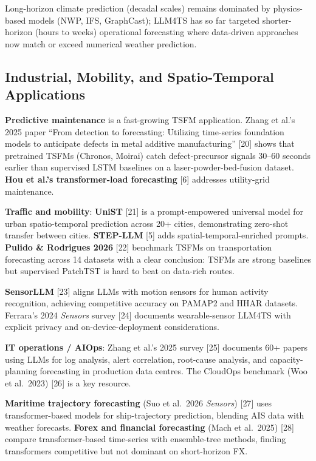 \documentclass{article}
\begin{document}
Long-horizon climate prediction (decadal scales) remains dominated by physics-based models (NWP, IFS, GraphCast); LLM4TS has so far targeted shorter-horizon (hours to weeks) operational forecasting where data-driven approaches now match or exceed numerical weather prediction.

\subsection{Industrial, Mobility, and Spatio-Temporal Applications}\label{industrial-mobility-and-spatio-temporal-applications}

\textbf{Predictive maintenance} is a fast-growing TSFM application. Zhang et al.'s 2025 paper ``From detection to forecasting: Utilizing time-series foundation models to anticipate defects in metal additive manufacturing'' {[}20{]} shows that pretrained TSFMs (Chronos, Moirai) catch defect-precursor signals 30--60 seconds earlier than supervised LSTM baselines on a laser-powder-bed-fusion dataset. \textbf{Hou et al.'s transformer-load forecasting} {[}6{]} addresses utility-grid maintenance.

\textbf{Traffic and mobility}: \textbf{UniST} \citep{yuan2024unistapromptempowe} {[}21{]} is a prompt-empowered universal model for urban spatio-temporal prediction across 20+ cities, demonstrating zero-shot transfer between cities. \textbf{STEP-LLM} {[}5{]} adds spatial-temporal-enriched prompts. \textbf{Pulido \& Rodrigues 2026} {[}22{]} benchmark TSFMs on transportation forecasting across 14 datasets with a clear conclusion: TSFMs are strong baselines but supervised PatchTST is hard to beat on data-rich routes.

\textbf{SensorLLM} \citep{li2025tsfmbenchacomprehe} {[}23{]} aligns LLMs with motion sensors for human activity recognition, achieving competitive accuracy on PAMAP2 and HHAR datasets. Ferrara's 2024 \emph{Sensors} survey {[}24{]} documents wearable-sensor LLM4TS with explicit privacy and on-device-deployment considerations.

\textbf{IT operations / AIOps}: Zhang et al.'s 2025 survey {[}25{]} documents 60+ papers using LLMs for log analysis, alert correlation, root-cause analysis, and capacity-planning forecasting in production data centres. The CloudOps benchmark (Woo et al.~2023) {[}26{]} is a key resource.

\textbf{Maritime trajectory forecasting} (Suo et al.~2026 \emph{Sensors}) {[}27{]} uses transformer-based models for ship-trajectory prediction, blending AIS data with weather forecasts. \textbf{Forex and financial forecasting} (Mach et al.~2025) {[}28{]} compare transformer-based time-series with ensemble-tree methods, finding transformers competitive but not dominant on short-horizon FX.
\end{document}
